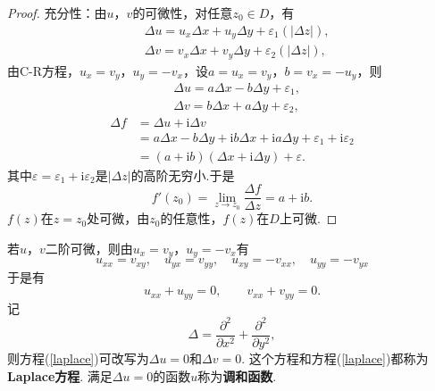 \documentclass[12pt]{ctexart}
\theoremstyle{definition}
\theoremstyle{plain}
\newcommand{\iu}{\mathrm{i}}
\begin{document}
\begin{proof}
		充分性：由$u$，$v$的可微性，对任意$z_0\in D$，有
		\begin{equation}
			\begin{aligned}
				&\Delta u=u_x\Delta x+u_y\Delta y+\varepsilon_1\left(|\Delta z|\right),\\
				&\Delta v=v_x\Delta x+v_y\Delta y+\varepsilon_2\left(|\Delta z|\right),
			\end{aligned}
		\end{equation}
		由C-R方程，$u_x=v_y$，$u_y=-v_x$，设$a=u_x=v_y$，$b=v_x=-u_y$，则
		\begin{equation}
			\begin{aligned}
				&\Delta u=a\Delta x-b\Delta y+\varepsilon_1,\\
				&\Delta v=b\Delta x+a\Delta y+\varepsilon_2,
			\end{aligned}
		\end{equation}
		\begin{equation}
			\begin{aligned}
				\Delta f&=\Delta u+\iu\Delta v\\
						&=a\Delta x-b\Delta y+\iu b\Delta x+\iu a\Delta y+\varepsilon_1+\iu\varepsilon_2\\
						&=\left(a+\iu b\right)\left(\Delta x+\iu \Delta y\right)+\varepsilon.
			\end{aligned}
		\end{equation}
		其中$\varepsilon=\varepsilon_1+\iu\varepsilon_2$是$|\Delta z|$的高阶无穷小.于是
		\begin{equation}
			f'(z_0)=\lim\limits_{z\to z_0}\frac{\Delta f}{\Delta z}=a+\iu b.
		\end{equation}
		$f(z)$在$z=z_0$处可微，由$z_0$的任意性，$f(z)$在$D$上可微.
	\end{proof}
	若$u$，$v$二阶可微，则由$u_x=v_y$，$u_y=-v_x$有
	\begin{equation}
		u_{xx}=v_{xy},\quad u_{yx}=v_{yy},\quad u_{xy}=-v_{xx},\quad u_{yy}=-v_{yx}
	\end{equation}
	于是有
	\begin{equation}\label{laplace}
		u_{xx}+u_{yy}=0,\qquad v_{xx}+v_{yy}=0.
	\end{equation}
	记
	\begin{equation}
		\varDelta=\frac{\partial^2}{\partial x^2}+\frac{\partial^2}{\partial y^2},
	\end{equation}
	则方程(\ref{laplace})可改写为$\varDelta u=0$和$\varDelta v=0$. 这个方程和方程(\ref{laplace})都称为\textbf{Laplace方程}. 满足$\varDelta u=0$的函数$u$称为\textbf{调和函数}.
	
\end{document}
